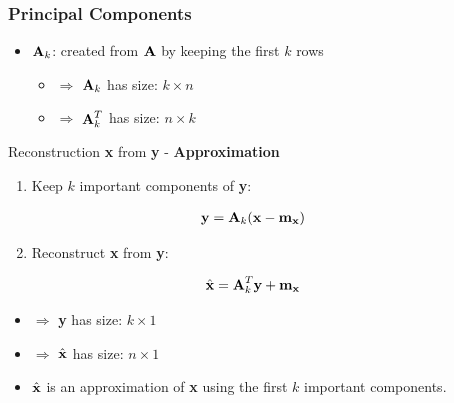 \documentclass[english,11pt,table,handout]{beamer}
\begin{document}
\frame
{
	\frametitle{Principal Components}
	\large	
	\begin{itemize}
		\item $\text{\textbf{A}}_k$: created from $\text{\textbf{A}}$ by keeping the first $k$ rows
		\begin{itemize}
			\item $\Rightarrow$ $\text{\textbf{A}}_k$ has size: $k \times n$
			\item $\Rightarrow$ $\text{\textbf{A}}_k^T$ has size: $n \times k$
		\end{itemize}
	\end{itemize}
	
	\begin{block}{Reconstruction \textbf{x} from \textbf{y} - \alert{\textbf{Approximation}} }
		\begin{enumerate}
			\setcounter{enumi}{0}
			\item Keep $k$ important components of \textbf{y}:
		\end{enumerate}
		\begin{equation}
		\nonumber
		\begin{split}
		\text{\textbf{y}} 
		&= \text{\textbf{A}}_k (\text{\textbf{x}} - \text{\textbf{m}}_\text{\textbf{x}})
		\end{split}
		\end{equation}
		\begin{enumerate}
			\setcounter{enumi}{1}
			\item Reconstruct \textbf{x} from \textbf{y}:
		\end{enumerate}
		\begin{equation}
		\nonumber
		\begin{split}
		\hat{\text{\textbf{x}} }
		&= \text{\textbf{A}}_k^T\text{\textbf{y}} + \text{\textbf{m}}_\text{\textbf{x}}
		\end{split}
		\end{equation}
	\end{block}
	
	\begin{itemize}
		\item $\Rightarrow$ \textbf{y} has size: $k \times 1$
		\item $\Rightarrow$ \textbf{$\hat{\text{\textbf{x}}}$} has size: $n \times 1$
		\item \alert{\textbf{$\hat{\text{\textbf{x}}}$} is an approximation of \textbf{x} using the first $k$ important components.}
	\end{itemize}
}
\end{document}
